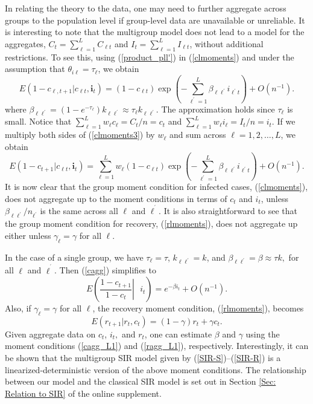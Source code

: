 \documentclass[12pt]{article}
\begin{document}
In relating the theory to the data, one may need to further aggregate across
groups to the population level if group-level data are unavailable or
unreliable. It is interesting to note that the multigroup model does not lead
to a model for the aggregates, $C_{t}=\sum_{\ell=1}^{L}C_{\ell t}$ and
$I_{t}=\sum_{\ell=1}^{L}I_{\ell t}$, without additional restrictions. To see
this, using (\ref{product_pll'}) in (\ref{clmoments}) and under the assumption
that $\theta_{i\ell}=\tau_{\ell}$, we obtain%
\begin{equation}
E\left(  1-c_{\ell,t+1}|c_{\ell t},\mathbf{i}_{t}\right)  =\left(  1-c_{\ell
t}\right)  \exp\left(  -\sum_{\ell^{\prime}=1}^{L}\beta_{\ell\ell^{\prime}%
}i_{\ell^{\prime}t}\right)  +O\left(  n^{-1}\right)  . \label{clmoments3}%
\end{equation}
where $\beta_{\ell\ell^{\prime}}=\left(  1-e^{-\tau_{\ell}}\right)
k_{\ell\ell^{\prime}}\approx\tau_{\ell}k_{\ell\ell^{\prime}}$. The
approximation holds since $\tau_{\ell}$ is small. Notice that $\sum_{\ell
=1}^{L}w_{\ell}c_{\ell}=C_{t}/n=c_{t}$ and $\sum_{\ell=1}^{L}w_{\ell}i_{\ell
}=I_{t}/n=i_{t}$. If we multiply both sides of (\ref{clmoments3}) by $w_{\ell
}$ and sum across $\ell=1,2,\ldots,L$, we obtain%
\begin{equation}
E\left(  1-c_{t+1}|c_{\ell t},\mathbf{i}_{t}\right)  =\sum_{\ell=1}^{L}%
w_{\ell}\left(  1-c_{\ell t}\right)  \exp\left(  -\sum_{\ell^{\prime}=1}%
^{L}\beta_{\ell\ell^{\prime}}i_{\ell^{\prime}t}\right)  +O\left(
n^{-1}\right)  . \label{cagg}%
\end{equation}
It is now clear that the group moment condition for infected cases,
(\ref{clmoments}), does not aggregate up to the moment conditions in terms of
$c_{t}$ and $i_{t}$, unless $\beta_{\ell\ell^{\prime}}/n_{\ell^{\prime}}$ is
the same across all $\ell$ and $\ell^{^{\prime}}$. It is also straightforward
to see that the group moment condition for recovery, (\ref{rlmoments}), does
not aggregate up either unless $\gamma_{\ell}=\gamma$ for all $\ell$.

In the case of a single group, we have $\tau_{\ell}=\tau$, $k_{\ell
\ell^{\prime}}=k$, and $\beta_{\ell\ell^{\prime}}=\beta\approx\tau k,$ for all
$\ell$ and $\ell^{^{\prime}}$. Then (\ref{cagg}) simplifies to%
\begin{equation}
E\left(  \left.  \frac{1-c_{t+1}}{1-c_{t}}\right\vert \text{ }i_{t}\right)
=e^{-\beta i_{t}}+O\left(  n^{-1}\right)  . \label{cagg_L1}%
\end{equation}
Also, if $\gamma_{\ell}=\gamma$ for all $\ell$, the recovery moment condition,
(\ref{rlmoments}), becomes
\begin{equation}
E\left(  r_{t+1}|r_{t},c_{t}\right)  =\left(  1-\gamma\right)  r_{t}+\gamma
c_{t}. \label{ragg_L1}%
\end{equation}
Given aggregate data on $c_{t}$, $i_{t},$ and $r_{t}$, one can estimate
$\beta$ and $\gamma$ using the moment conditions (\ref{cagg_L1}) and
(\ref{ragg_L1}), respectively. Interestingly, it can be shown that the
multigroup SIR model given by (\ref{SIR-S})--(\ref{SIR-R}) is a
linearized-deterministic version of the above moment conditions. The
relationship between our model and the classical SIR model is set out in
Section \ref{Sec: Relation to SIR} of the online supplement.
\end{document}
